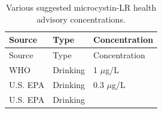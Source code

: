 \documentclass[11pt,]{article}
\begin{document}
\begin{longtable}[c]{@{}lll@{}}
\caption{Various suggested microcystin-LR health advisory
concentrations. \label{tab:microcystin_levels}}\tabularnewline
\toprule
\begin{minipage}[b]{0.11\columnwidth}\raggedright\strut
Source
\strut\end{minipage} &
\begin{minipage}[b]{0.16\columnwidth}\raggedright\strut
Type
\strut\end{minipage} &
\begin{minipage}[b]{0.20\columnwidth}\raggedright\strut
Concentration
\strut\end{minipage}\tabularnewline
\midrule
\endfirsthead
\toprule
\begin{minipage}[b]{0.11\columnwidth}\raggedright\strut
Source
\strut\end{minipage} &
\begin{minipage}[b]{0.16\columnwidth}\raggedright\strut
Type
\strut\end{minipage} &
\begin{minipage}[b]{0.20\columnwidth}\raggedright\strut
Concentration
\strut\end{minipage}\tabularnewline
\midrule
\endhead
\begin{minipage}[t]{0.11\columnwidth}\raggedright\strut
WHO
\strut\end{minipage} &
\begin{minipage}[t]{0.16\columnwidth}\raggedright\strut
Drinking
\strut\end{minipage} &
\begin{minipage}[t]{0.20\columnwidth}\raggedright\strut
1 \(\mu\)g/L
\strut\end{minipage}\tabularnewline
\begin{minipage}[t]{0.11\columnwidth}\raggedright\strut
U.S. EPA
\strut\end{minipage} &
\begin{minipage}[t]{0.16\columnwidth}\raggedright\strut
Drinking
\strut\end{minipage} &
\begin{minipage}[t]{0.20\columnwidth}\raggedright\strut
0.3 \(\mu\)g/L
\strut\end{minipage}\tabularnewline
\begin{minipage}[t]{0.11\columnwidth}\raggedright\strut
U.S. EPA
\strut\end{minipage} &
\begin{minipage}[t]{0.16\columnwidth}\raggedright\strut
Drinking
\strut\end{minipage} &

\end{longtable}
\end{document}
